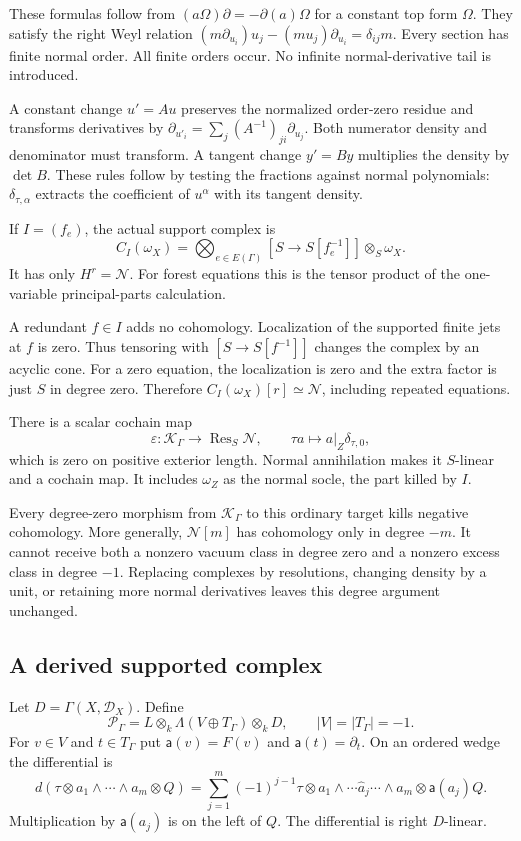 These formulas follow from
$(a\Omega)\partial=-\partial(a)\Omega$ for a constant top form
$\Omega$. They satisfy the right Weyl relation
$(m\partial_{u_i})u_j-(mu_j)\partial_{u_i}=\delta_{ij}m$.
Every section has finite normal order. All finite orders occur.
No infinite normal-derivative tail is introduced.

A constant change $u'=Au$ preserves the normalized order-zero
residue and transforms derivatives by
$\partial_{u'_i}=\sum_j(A^{-1})_{ji}\partial_{u_j}$.
Both numerator density and denominator must transform.
A tangent change $y'=By$ multiplies the density by $\det B$.
These rules follow by testing the fractions against normal
polynomials: $\delta_{\tau,\alpha}$ extracts the coefficient
of $u^\alpha$ with its tangent density.

If $I=(f_e)$, the actual support complex is
\[
 C_I(\omega_X)=
 \bigotimes_{e\in E(\Gamma)}[S\longrightarrow S[f_e^{-1}]]
       \otimes_S\omega_X.
\]
It has only $H^r=\mathcal N$. For forest equations this is the
tensor product of the one-variable principal-parts calculation.

A redundant $f\in I$ adds no cohomology.
Localization of the supported finite jets at $f$ is zero.
Thus tensoring with $[S\to S[f^{-1}]]$ changes the complex
by an acyclic cone.
For a zero equation, the localization is zero and the extra
factor is just $S$ in degree zero. Therefore
$C_I(\omega_X)[r]\simeq\mathcal N$, including repeated equations.

There is a scalar cochain map
\[
 \varepsilon:\mathcal K_\Gamma\longrightarrow\operatorname{Res}_S\mathcal N,
 \qquad \tau a\longmapsto a|_Z\delta_{\tau,0},
\]
which is zero on positive exterior length.
Normal annihilation makes it $S$-linear and a cochain map.
It includes $\omega_Z$ as the normal socle, the part killed by $I$.

Every degree-zero morphism from $\mathcal K_\Gamma$ to this
ordinary target kills negative cohomology. More generally, $\mathcal N[m]$ has cohomology only in degree $-m$.
It cannot receive both a nonzero vacuum class in degree zero
and a nonzero excess class in degree $-1$.
Replacing complexes by resolutions, changing density by a unit,
or retaining more normal derivatives leaves this degree argument
unchanged.

\subsection{A derived supported complex}

Let $D=\Gamma(X,\mathcal D_X)$. Define
\begin{equation}\label{v4-arith:curve:eq:spencer}
 \mathcal P_\Gamma=L\otimes_k\Lambda(V\oplus T_\Gamma)\otimes_kD,
 \qquad |V|=|T_\Gamma|=-1.
\end{equation}
For $v\in V$ and $t\in T_\Gamma$ put
$\mathsf a(v)=F(v)$ and $\mathsf a(t)=\partial_t$.
On an ordered wedge the differential is
\[
 d(\tau\otimes a_1\wedge\cdots\wedge a_m\otimes Q)
 =\sum_{j=1}^m(-1)^{j-1}\tau\otimes
    a_1\wedge\cdots\widehat a_j\cdots\wedge a_m
          \otimes\mathsf a(a_j)Q.
\]
Multiplication by $\mathsf a(a_j)$ is on the left of $Q$.
The differential is right $D$-linear.

